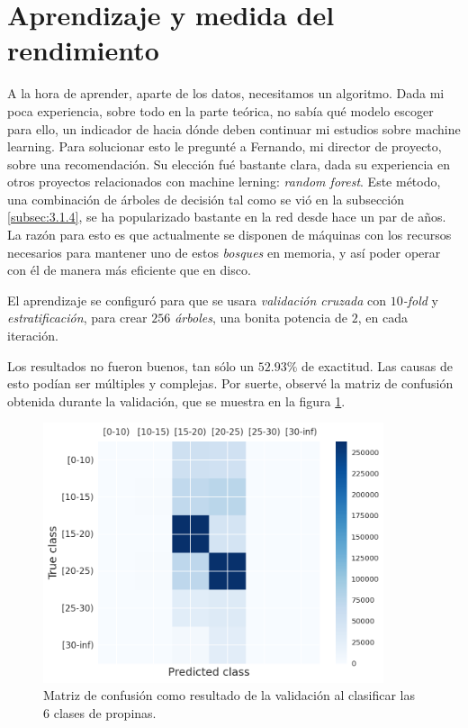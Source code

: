 \vspace*{5mm}

\section{Aprendizaje y medida del rendimiento} \label{sec:5.3}

A la hora de aprender, aparte de los datos, necesitamos un algoritmo. Dada mi poca experiencia, sobre todo en la parte teórica, no sabía qué modelo escoger para ello, un indicador de hacia dónde deben continuar mi estudios sobre machine learning. Para solucionar esto le pregunté a Fernando, mi director de proyecto, sobre una recomendación. Su elección fué bastante clara, dada su experiencia en otros proyectos relacionados con machine lerning: \emph{random forest}. Este método, una combinación de árboles de decisión tal como se vió en la subsección \ref{subsec:3.1.4}, se ha popularizado bastante en la red desde hace un par de años. La razón para esto es que actualmente se disponen de máquinas con los recursos necesarios para mantener uno de estos \emph{bosques} en memoria, y así poder operar con él de manera más eficiente que en disco.

El aprendizaje se configuró para que se usara \emph{validación cruzada} con \emph{$10$-fold} y \emph{estratificación}, para crear \emph{$256$ árboles}, una bonita potencia de $2$, en cada iteración.

Los resultados no fueron buenos, tan sólo un $52.93\%$ de exactitud. Las causas de esto podían ser múltiples y complejas. Por suerte, observé la matriz de confusión obtenida durante la validación, que se muestra en la figura \ref{fig:5.13}.

\begin{figure}[H]
  \centering
  \includegraphics[width=100mm]{figures/ch_05/confusion_matrix_1.png}
  \caption{Matriz de confusión como resultado de la validación al clasificar las 6 clases de propinas.}
  \label{fig:5.13}
\end{figure}

